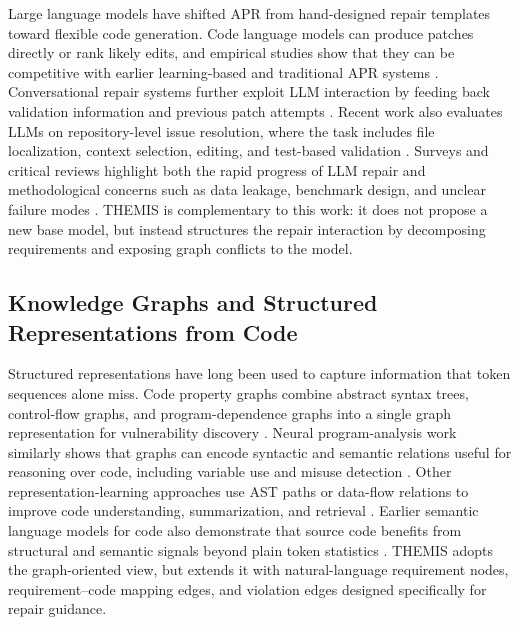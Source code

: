 \documentclass[11pt]{article}
\begin{document}
Large language models have shifted APR from hand-designed repair templates toward flexible code generation.  Code language models can produce patches directly or rank likely edits, and empirical studies show that they can be competitive with earlier learning-based and traditional APR systems \citep{jiang-etal-2023-code-lms-apr,sobania-etal-2023-chatgpt-bugfixing}.  Conversational repair systems further exploit LLM interaction by feeding back validation information and previous patch attempts \citep{xia-zhang-2023-conversational-apr,xia-etal-2024-chatrepair}.  Recent work also evaluates LLMs on repository-level issue resolution, where the task includes file localization, context selection, editing, and test-based validation \citep{jimenez-etal-2024-swebench,yang-etal-2024-swe-agent,xia-etal-2024-agentless}.  Surveys and critical reviews highlight both the rapid progress of LLM repair and methodological concerns such as data leakage, benchmark design, and unclear failure modes \citep{zhang-etal-2024-critical-review-chatgpt-apr,zubair-etal-2025-llm-program-repair-slr}.  THEMIS is complementary to this work: it does not propose a new base model, but instead structures the repair interaction by decomposing requirements and exposing graph conflicts to the model.

\subsection{Knowledge Graphs and Structured Representations from Code}
\label{subsec:code-graphs}

Structured representations have long been used to capture information that token sequences alone miss.  Code property graphs combine abstract syntax trees, control-flow graphs, and program-dependence graphs into a single graph representation for vulnerability discovery \citep{yamaguchi-etal-2014-code-property-graphs}.  Neural program-analysis work similarly shows that graphs can encode syntactic and semantic relations useful for reasoning over code, including variable use and misuse detection \citep{allamanis-etal-2018-program-graphs}.  Other representation-learning approaches use AST paths or data-flow relations to improve code understanding, summarization, and retrieval \citep{alon-etal-2019-code2seq,alon-etal-2019-code2vec,guo-etal-2021-graphcodebert}.  Earlier semantic language models for code also demonstrate that source code benefits from structural and semantic signals beyond plain token statistics \citep{nguyen-etal-2013-statistical-semantic-code}.  THEMIS adopts the graph-oriented view, but extends it with natural-language requirement nodes, requirement--code mapping edges, and violation edges designed specifically for repair guidance.
\end{document}
